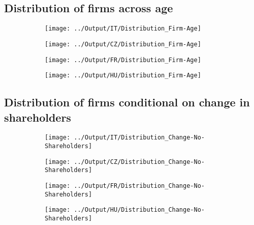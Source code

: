 \documentclass[12pt,notitlepage]{article}
\begin{document}
\subsection{Distribution of firms across age}

\begin{figure}[!htpb]
\centering
\caption{Distribution of firms across age}
\begin{subfigure}{.49\textwidth}
    \centering
 \texttt{[image: ../Output/IT/Distribution\_Firm-Age]}
\end{subfigure}%
\begin{subfigure}{.49\textwidth}
    \centering
 \texttt{[image: ../Output/CZ/Distribution\_Firm-Age]}
\end{subfigure}
\begin{subfigure}{.49\textwidth}
    \centering
 \texttt{[image: ../Output/FR/Distribution\_Firm-Age]}
\end{subfigure}%
\begin{subfigure}{.49\textwidth}
    \centering
 \texttt{[image: ../Output/HU/Distribution\_Firm-Age]}
\end{subfigure}
\end{figure}
\pagebreak

\subsection{Distribution of firms conditional on change in shareholders}

\begin{figure}[!htpb]
\centering
\caption{Distribution of firms conditional on change in shareholders}
\begin{subfigure}{.49\textwidth}
    \centering
 \texttt{[image: ../Output/IT/Distribution\_Change-No-Shareholders]}
\end{subfigure}%
\begin{subfigure}{.49\textwidth}
    \centering
 \texttt{[image: ../Output/CZ/Distribution\_Change-No-Shareholders]}
\end{subfigure}
\begin{subfigure}{.49\textwidth}
    \centering
 \texttt{[image: ../Output/FR/Distribution\_Change-No-Shareholders]}
\end{subfigure}%
\begin{subfigure}{.49\textwidth}
    \centering
 \texttt{[image: ../Output/HU/Distribution\_Change-No-Shareholders]}
\end{subfigure}
\end{figure}
\pagebreak
\end{document}
